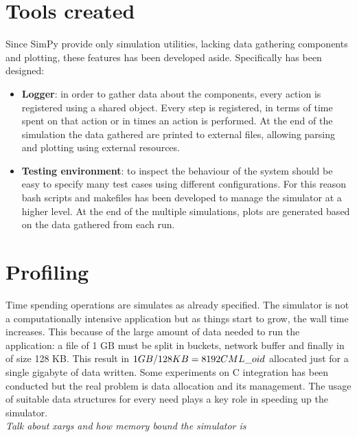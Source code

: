 \section{Tools created}
Since SimPy provide only simulation utilities, lacking data gathering components
and plotting, these features has been developed aside. Specifically has been designed:
\begin{itemize}
    \item \textbf{Logger}: in order to gather data about the components, every
        action is registered using a shared object. Every step is registered, in
        terms of time spent on that action or in times an action is performed.
        At the end of the simulation the data gathered are printed to external
        files, allowing parsing and plotting using external resources.
    \item \textbf{Testing environment}: to inspect the behaviour of the system
        should be easy to specify many test cases using different
        configurations. For this reason bash scripts and makefiles has been
        developed to manage the simulator at a higher level. At the end of the
        multiple simulations, plots are generated based on the data gathered
        from each run.
\end{itemize}



\section{Profiling}\label{profiling}
Time spending operations are simulates as already specified. The simulator is
not a computationally intensive application but as things start to grow, the
wall time increases. This because of the large amount of data needed to run the
application: a file of 1 GB must be split in buckets, network buffer and
finally in \cmloid of size 128 KB. This result in $1GB / 128KB = 8192 CML\_oid$
allocated just for a single gigabyte of data written. Some experiments on C
integration has been conducted but the real problem is data allocation and its
management. The usage of suitable data structures for every need plays a key
role in speeding up the simulator. \\
\textit{Talk about xargs and how memory bound the simulator is}


